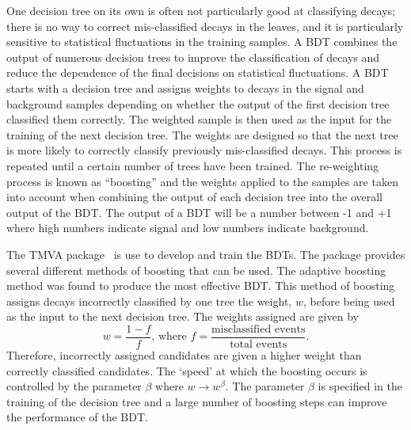 One decision tree on its own is often not particularly good at classifying decays; there is no way to correct mis-classified decays in the leaves, and it is particularly sensitive to statistical fluctuations in the training samples. A BDT combines the output of numerous decision trees to improve the classification of decays and reduce the dependence of the final decisions on statistical fluctuations. A BDT starts with a decision tree and assigns weights to decays in the signal and background samples depending on whether the output of the first decision tree classified them correctly. The weighted sample is then used as the input for the training of the next decision tree. The weights are designed so that the next tree is more likely to correctly classify previously mis-classified decays. This process is repeated until a certain number of trees have been trained. The re-weighting process is known as ``boosting'' and the weights applied to the samples are taken into account when combining the output of each decision tree into the overall output of the BDT. The output of a BDT will be a number between -1 and +1 where high numbers indicate signal and low numbers indicate background.


The TMVA package~\cite{Hocker:2007ht} is use to develop and train the BDTs. The package provides several different methods of boosting that can be used. The adaptive boosting method was found to produce the most effective BDT.
This method of boosting assigns decays incorrectly classified by one tree the weight, $w$, before being used as the input to the next decision tree. The weights assigned are given by
\begin{equation}
w = \frac{1 - f}{f}\text{, where } f = \frac{\text{misclassified events}}{\text{total events}}.
\end{equation}
Therefore, incorrectly assigned candidates are given a higher weight than correctly classified candidates. The `speed’ at which the boosting occurs is controlled by the parameter $\beta$ where $w \rightarrow w^{\beta}$. The parameter $\beta$ is specified in the training of the decision tree and a large number of boosting steps can improve the performance of the BDT.

